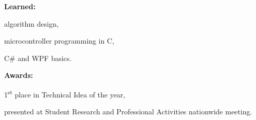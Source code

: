 \documentclass[a4paper]{deedy-resume}
\begin{document}
\vspace{\topsep}
\textbf{Learned:}
\begin{tightitemize}
    \item algorithm design,
    \item microcontroller programming in C,
    \item C\# and WPF basics.
\end{tightitemize}

\vspace{\topsep}
\textbf{Awards:}
\begin{tightitemize}
    \item 1\textsuperscript{st} place in Technical Idea of the year,
    \item presented at Student Research and Professional Activities nationwide meeting.
\end{tightitemize}
\end{document}
